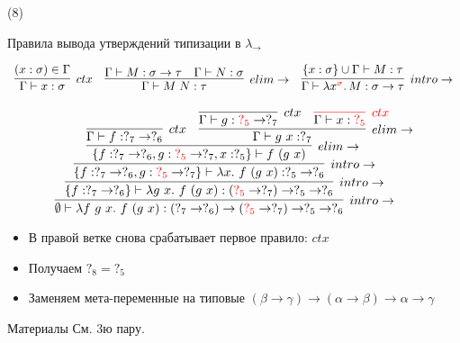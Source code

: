     \begin{frame}[t, noframenumbering]{\btypename (8)}
        \begin{block}{Правила вывода утверждений типизации в $\lambda_{\rightarrow}$}
            \vspace{-1em}
            \begin{center}
                \[
                    \begin{array}{l c r}
                        \infer[ctx]{\Gamma \vdash x: \sigma}{(x: \sigma) \in \Gamma}
                        &
                        \infer[elim\to]{\Gamma \vdash M\;N : \tau}{\Gamma \vdash M : \sigma \to \tau & \Gamma \vdash N : \sigma}
                        &
                        \infer[intro\to]{\Gamma \vdash \lambda x^{\color{red} \sigma}\ldotp M : \sigma \to \tau}{\{x : \sigma\} \cup \Gamma \vdash M : \tau}
                    \end{array}
                \]
            \end{center}
        \end{block}
        \[
            \infer[intro\to]{\emptyset \vdash \lambda f~g~x.~f~(g~x) : (?_7 \to ?_6) \to ({\color{red} ?_5} \to ?_7) \to ?_5 \to ?_6}{
                \infer[intro\to]{\{f: ?_7 \to ?_6\} \vdash \lambda g~x.~f~(g~x) : ({\color{red} ?_5} \to ?_7) \to ?_5 \to ?_6}{
                    \infer[intro\to]{\{f: ?_7 \to ?_6, g: {\color{red}?_5} \to ?_7\} \vdash \lambda x.~f~(g~x) : ?_5 \to ?_6 }{
                        \infer[elim\to]{\{f: ?_7 \to ?_6, g: {\color{red}?_5} \to ?_7, x: ?_5\} \vdash f~(g~x) }{
                            \infer[ctx]{\Gamma \vdash f : ?_7 \to ?_6}{} &
                            \infer[elim\to]{\Gamma \vdash g \ap x : ?_7}{
                                \infer[ctx]{\Gamma \vdash g : {\color{red}?_5} \to ?_7}{} &
                                \color{red} \infer[ctx]{\color{black} \Gamma \vdash x : {\color{red} ?_5}}{}
                            }}}}}
        \]
        \vspace{-1em}
        \begin{itemize}
            \item В правой ветке снова срабатывает первое правило: $ctx$
            \item Получаем $?_8 = ?_5$
            \item[\answer] Заменяем мета-переменные на типовые $(\beta \to \gamma) \to (\alpha \to \beta) \to \alpha \to \gamma$
        \end{itemize}
    \end{frame}


    \begin{frame}[fragile]{Материалы}
        См. 3ю пару.
    \end{frame}


